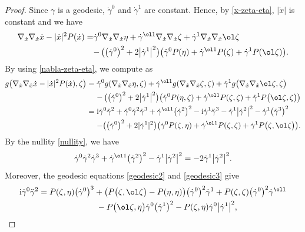 \begin{proof}
Since $\gamma$ is a geodesic, $\dot\gamma^0$ and $\dot\gamma^1$ are constant.
Hence, by \eqref{x-zeta-eta}, $|\dot x|$ is constant and we have
\begin{align*}
\nabla_{\dot x}\nabla_{\dot x}\dot x-|\dot x|^2P(\dot x)
=&\dot\gamma^0\nabla_{\dot x}\nabla_{\dot x}\eta+
\dot\gamma^{\ol1}\nabla_{\dot x}\nabla_{\dot x}\zeta+\dot\gamma^1\nabla_{\dot x}\nabla_{\dot x}\ol\zeta \\
&{}{-}\,\bigl(\bigl(\dot\gamma^0\bigr)^2+2\bigl|\dot\gamma^1\bigr|^2\bigr)\bigl(\dot\gamma^0P(\eta)+\dot\gamma^{\ol1}P(\zeta)+\dot\gamma^1P(\ol\zeta)\bigr).
\end{align*}
By using \eqref{nabla-zeta-eta}, we compute as
\begin{align*}
g\bigl(\nabla_{\dot x}\nabla_{\dot x}\dot x-|\dot x|^2P(\dot x) ,\zeta\bigr)
={}&\dot\gamma^0g(\nabla_{\dot x}\nabla_{\dot x}\eta, \zeta)+
\dot\gamma^{\ol1}g(\nabla_{\dot x}\nabla_{\dot x}\zeta, \zeta)+\dot\gamma^1g\bigl(\nabla_{\dot x}\nabla_{\dot x}\ol\zeta, \zeta\bigr) \\
&{}{-}\,\bigl(\bigl(\dot\gamma^0\bigr)^2+2\bigl|\dot\gamma^1\bigr|^2\bigr)\bigl(\dot\gamma^0P(\eta, \zeta)+\dot\gamma^{\ol1}P(\zeta, \zeta)+\dot\gamma^1P\bigl(\ol\zeta, \zeta\bigr)\bigr) \\
={}&{\rm i}\dot\gamma^0\ddot\gamma^2+\dot\gamma^0\dot\gamma^2\dot\gamma^3+\dot\gamma^{\ol1}\bigl(\dot\gamma^2\bigr)^2
-{\rm i}\dot\gamma^1\ddot\gamma^3-\dot\gamma^1\bigl|\dot\gamma^2\bigr|^2-\dot\gamma^1\bigl(\dot\gamma^3\bigr)^2 \\
&{}{-}\bigl(\bigl(\dot\gamma^0\bigr)^2+2|\dot\gamma^1|^2\bigr)\bigl(\dot\gamma^0P(\zeta, \eta)+\dot\gamma^{\ol1}P(\zeta, \zeta)+\dot\gamma^1P\bigl(\zeta, \ol\zeta\bigr)\bigr).
\end{align*}
By the nullity \eqref{nullity}, we have
\[
\dot\gamma^0\dot\gamma^2\dot\gamma^3+\dot\gamma^{\ol1}\bigl(\dot\gamma^2\bigr)^2 -\dot\gamma^1\bigl|\dot\gamma^2\bigr|^2=-2\dot\gamma^1\bigl|\dot\gamma^2\bigr|^2.
\]
Moreover, the geodesic equations \eqref{geodesic2} and \eqref{geodesic3} give
\begin{gather*}
{\rm i}\dot\gamma^0\ddot\gamma^2=P(\zeta, \eta)\bigl(\dot\gamma^0\bigr)^3+\bigl(P\bigl(\zeta, \ol\zeta\bigr)-P(\eta, \eta)\bigr)\bigl(\dot\gamma^0\bigr)^2\dot\gamma^1+P(\zeta, \zeta) \bigl(\dot\gamma^0\bigr)^2\dot\gamma^{\ol1} \\
\hphantom{{\rm i}\dot\gamma^0\ddot\gamma^2=}{}
-P\bigl(\ol\zeta, \eta\bigr)\dot\gamma^0\bigl(\dot\gamma^1\bigr)^2-P(\zeta, \eta)\dot\gamma^0\bigl|\dot\gamma^1\bigr|^2, \\

\end{gather*}
\end{proof}
